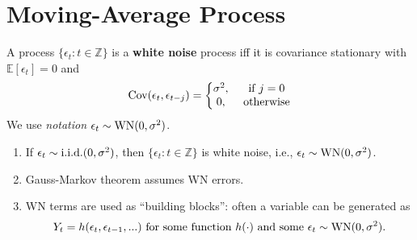\documentclass[11pt]{elegantbook}
\begin{document}
\section{Moving-Average Process}
\begin{definition}
    A process $\{\epsilon_t:t\in \mathbb{Z}\}$ is a \textbf{white noise} process iff it is covariance stationary with $\mathbb{E}[\epsilon_t]=0$ and
    \begin{equation}
        \begin{aligned}
            \textnormal{Cov}(\epsilon_t,\epsilon_{t-j})=\left\{\begin{matrix}
                \sigma^2,& \textnormal{ if }j=0\\
                0,& \textnormal{ otherwise}
            \end{matrix}\right.
        \end{aligned}
        \nonumber
    \end{equation}
    We use \textit{notation} $\epsilon_t\sim \textnormal{WN}(0,\sigma^2)$.
\end{definition}
\begin{note}
    \begin{enumerate}
        \item If $\epsilon_t\sim \textnormal{i.i.d.}(0,\sigma^2)$, then $\{\epsilon_t:t\in \mathbb{Z}\}$ is white noise, i.e., $\epsilon_t\sim \textnormal{WN}(0,\sigma^2)$.
        \item Gauss-Markov theorem assumes WN errors.
        \item WN terms are used as ``building blocks'': often a variable can be generated as
        \begin{equation}
            \begin{aligned}
                Y_t=h(\epsilon_t,\epsilon_{t-1},...) \textnormal{ for some function $h(\cdot)$ and some $\epsilon_t\sim \textnormal{WN}(0,\sigma^2)$.}
            \end{aligned}
            \nonumber
        \end{equation}
    \end{enumerate}
\end{note}
\end{document}
